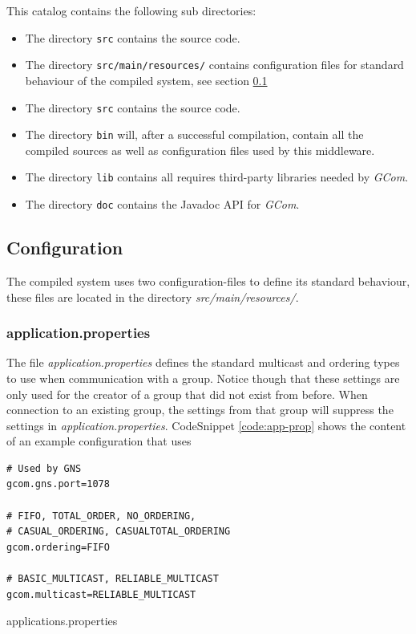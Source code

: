\documentclass[titlepage, twocolumn, a4paper, 10pt]{article}
\begin{document}
This catalog contains the following sub directories:
\begin{itemize}
\item The directory \verb!src! contains the source code.
\item The directory \verb!src/main/resources/! contains configuration
  files for standard behaviour of the compiled system, see section
  \ref{sec:configuration}
\item The directory \verb!src! contains the source code.
\item The directory \verb!bin! will, after a successful compilation,
  contain all the compiled sources as well as configuration files used
  by this middleware.
\item The directory \verb!lib! contains all requires third-party libraries
  needed by \textit{GCom}.
\item The directory \verb!doc! contains the Javadoc API for \textit{GCom}.
\end{itemize}

\subsection{Configuration}\label{sec:configuration}
The compiled system uses two configuration-files to define its
standard behaviour, these files are located in the directory
\textit{src/main/resources/}.

\subsubsection{application.properties}\label{sec:application.properties}
The file \textit{application.properties} defines the standard
multicast and ordering types to use when communication with a group.
Notice though that these settings are only used for the creator of a
group that did not exist from before. When connection to an existing
group, the settings from that group will suppress the settings in
\textit{application.properties}. CodeSnippet \ref{code:app-prop}
shows the content of an example configuration that uses

\begin{code}
  \begin{footnotesize}
\begin{verbatim}
# Used by GNS
gcom.gns.port=1078

# FIFO, TOTAL_ORDER, NO_ORDERING,
# CASUAL_ORDERING, CASUALTOTAL_ORDERING
gcom.ordering=FIFO

# BASIC_MULTICAST, RELIABLE_MULTICAST
gcom.multicast=RELIABLE_MULTICAST
\end{verbatim}
  \end{footnotesize}
  \caption{applications.properties}\label{code:app-prop}
\end{code}
\end{document}

